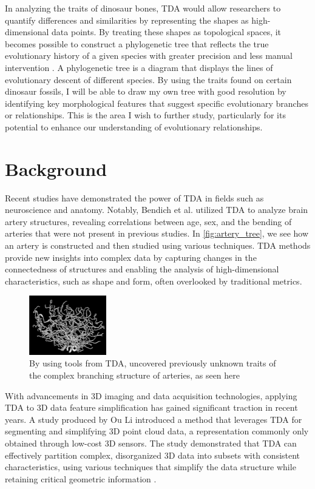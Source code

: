 \documentclass[12pt]{article}
\begin{document}
In analyzing the traits of dinosaur bones, TDA would allow researchers to quantify
differences and similarities by representing the shapes as high-dimensional data
points. By treating these shapes as topological spaces, it becomes possible to
construct a phylogenetic tree that reflects the true evolutionary history of a
given species with greater precision and less manual intervention \citep{yang2012}.
A phylogenetic tree is a diagram that displays the lines of evolutionary descent
of different species. By using the traits found on certain dinosaur fossils, I
will be able to draw my own tree with good resolution by identifying key
morphological features that suggest specific evolutionary branches or
relationships. This is the area I wish to further study, particularly for its 
potential to enhance our understanding of evolutionary relationships. 

\section{Background}
Recent studies have demonstrated the power of TDA in fields such as neuroscience
and anatomy. Notably, Bendich et al. \cite{bendich2016} utilized 
TDA to analyze brain artery structures, revealing correlations between age, sex, 
and the bending of arteries that were not present in previous studies. In
\autoref{fig:artery_tree}, we see how an artery is constructed and then studied 
using various techniques. TDA methods provide new insights into complex 
data by capturing changes in the connectedness of structures and enabling the 
analysis of high-dimensional characteristics, such as shape and form, often 
overlooked by traditional metrics. 

\begin{figure}
	\centering
	\includegraphics[width=0.3\textwidth]{arteryTree.png}
	\caption{By using tools from TDA, \cite{bendich2016} uncovered previously
unknown traits of the complex branching structure of arteries, as seen here}
	\label{fig:artery_tree}
\end{figure}

With advancements in 3D imaging and data acquisition technologies, applying TDA 
to 3D data feature simplification has gained significant
traction in recent years. A study produced by Ou Li \citep{li2021} introduced a 
method that leverages TDA for segmenting and simplifying 3D point cloud data, a
representation commonly only obtained through low-cost 3D sensors. 
The study demonstrated that TDA can effectively partition complex, disorganized 
3D data into subsets with consistent characteristics, using various techniques 
that simplify the data structure while retaining critical geometric information
\citep{li2021}.
\end{document}
